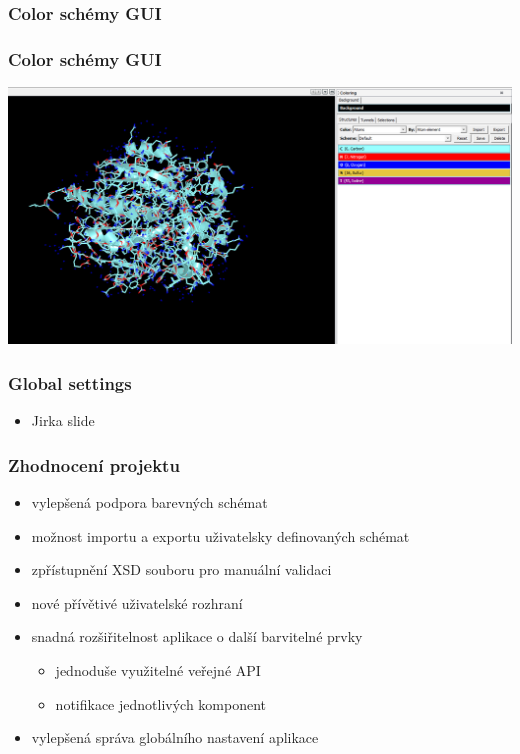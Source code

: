 \documentclass[slovak]{beamer}
\begin{document}
\begin{frame}
\frametitle{Color schémy GUI}
	\frametitle{Color schémy GUI}
	\includegraphics[width=\linewidth]{colorpanel.jpg}
\end{frame}

\begin{frame}
\frametitle{Global settings}
	\begin{itemize}
		\item Jirka slide
	\end{itemize}
\end{frame}

\begin{frame}
\frametitle{Zhodnocení projektu}
	\begin{itemize}
		\item vylepšená podpora barevných schémat
		\item možnost importu a exportu uživatelsky definovaných schémat
		\item zpřístupnění XSD souboru pro manuální validaci
		\item nové přívětivé uživatelské rozhraní
		\item snadná rozšiřitelnost aplikace o další barvitelné prvky
		\begin{itemize}
			\item jednoduše využitelné veřejné API
			\item notifikace jednotlivých komponent
		\end{itemize}
		\item vylepšená správa globálního nastavení aplikace 
	\end{itemize}
\end{frame}
\end{document}
